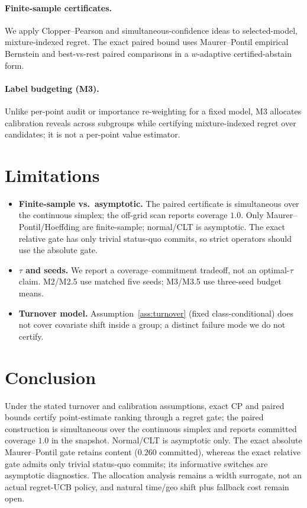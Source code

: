 \documentclass{article}
\begin{document}
\paragraph{Finite-sample certificates.} We apply Clopper--Pearson and simultaneous-confidence
ideas \citep{vovk2005conformal, clopper1934inverse} to selected-model, mixture-indexed regret.
The exact paired bound uses Maurer--Pontil empirical Bernstein \citep{maurer2009bernstein} and
best-vs-rest paired comparisons \citep{dunnett1955multiple, hsu1984simultaneous} in a
$w$-adaptive certified-abstain form.

\paragraph{Label budgeting (M3).} Unlike per-point audit or importance re-weighting for a
fixed model, M3 allocates calibration reveals across subgroups while certifying
mixture-indexed regret over candidates; it is not a per-point value estimator.

\section{Limitations}
\label{sec:limits}
\begin{itemize}
\item \textbf{Finite-sample vs.\ asymptotic.} The paired certificate is simultaneous over the
continuous simplex; the off-grid scan reports coverage $1.0$. Only Maurer--Pontil/Hoeffding
are finite-sample; normal/CLT is asymptotic. The exact relative gate has only trivial
status-quo commits, so strict operators should use the absolute gate.
\item \textbf{$\tau$ and seeds.} We report a coverage--commitment tradeoff, not an
optimal-$\tau$ claim. M2/M2.5 use matched five seeds; M3/M3.5 use three-seed budget means.
\item \textbf{Turnover model.} Assumption~\ref{ass:turnover} (fixed class-conditional) does
not cover covariate shift inside a group; a distinct failure mode we do not certify.
\end{itemize}

\section{Conclusion}
\label{sec:concl}
Under the stated turnover and calibration assumptions, exact CP and paired bounds certify
point-estimate ranking through a regret gate; the paired construction is simultaneous over the
continuous simplex and reports committed coverage $1.0$ in the snapshot. Normal/CLT is
asymptotic only. The exact absolute Maurer--Pontil gate retains content ($0.260$ committed),
whereas the exact relative gate admits only trivial status-quo commits; its informative
switches are asymptotic diagnostics. The allocation analysis remains a width surrogate, not an
actual regret-UCB policy, and natural time/geo shift plus fallback cost remain open.
\end{document}
